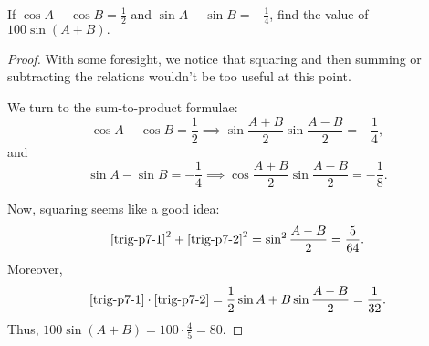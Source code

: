 \documentclass[../jarvis.tex]{subfiles}
\begin{document}
\begin{example}[2021 SMO(S) P7]
    If $\cos{A}-\cos{B}=\frac{1}{2}$ and $\sin{A}-\sin{B}=-\frac{1}{4}$, find the value of $100\sin{(A+B)}.$
\end{example}
\begin{proof}
    With some foresight, we notice that squaring and then summing or subtracting the relations wouldn't be too useful at this point.

    We turn to the sum-to-product formulae:
    \begin{equation}\label{trig-p7-1}
        \cos{A}-\cos{B}=\frac{1}{2} \implies \sin{\frac{A+B}{2}}\sin{\frac{A-B}{2}}=-\frac{1}{4},
    \end{equation}
    and 
    \begin{equation}\label{trig-p7-2}
        \sin{A}-\sin{B}=-\frac{1}{4} \implies \cos{\frac{A+B}{2}}\sin{\frac{A-B}{2}}=-\frac{1}{8}.
    \end{equation}

    Now, squaring seems like a good idea:
    $$\eqref{trig-p7-1}^2+\eqref{trig-p7-2}^2=\sin^2{\frac{A-B}{2}=\frac{5}{64}}.$$
    Moreover, 
    $$\eqref{trig-p7-1}\cdot\eqref{trig-p7-2}=\frac{1}{2}\sin{A+B}\sin{\frac{A-B}{2}}=\frac{1}{32}.$$
    Thus, $100\sin(A+B)=100\cdot\frac{4}{5}=80.$
\end{proof}
\end{document}
